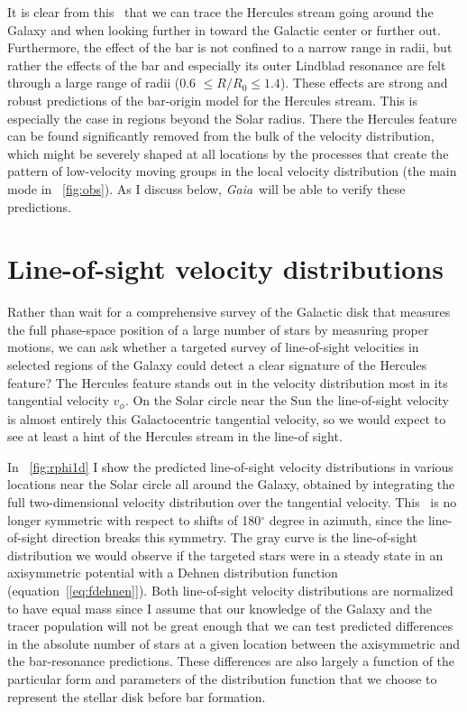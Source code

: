 \documentclass[12pt,preprint]{aastex}
\newcommand{\eqnname}{equation}
\newcommand{\Gaia}{\emph{Gaia}}
\newcommand{\vphi}{\ensuremath{v_{\phi}}}
\newcommand{\Ro}{\ensuremath{R_0}}
\begin{document}
It is clear from this \figurename\ that we can trace the Hercules
stream going around the Galaxy and when looking further in toward the
Galactic center or further out. Furthermore, the effect of the bar is
not confined to a narrow range in radii, but rather the effects of the
bar and especially its outer Lindblad resonance are felt through a
large range of radii (0.6 $\leq R/\Ro \leq 1.4$). These effects are
strong and robust predictions of the bar-origin model for the Hercules
stream. This is especially the case in regions beyond the Solar
radius. There the Hercules feature can be found significantly removed
from the bulk of the velocity distribution, which might be severely
shaped at all locations by the processes that create the pattern of
low-velocity moving groups in the local velocity distribution (the
main mode in \figurename~\ref{fig:obs}). As I discuss below, \Gaia\
will be able to verify these predictions.




\section{Line-of-sight velocity distributions}

Rather than wait for a comprehensive survey of the Galactic disk that
measures the full phase-space position of a large number of stars by
measuring proper motions, we can ask whether a targeted survey of
line-of-sight velocities in selected regions of the Galaxy could
detect a clear signature of the Hercules feature? The Hercules feature
stands out in the velocity distribution most in its tangential
velocity $\vphi$. On the Solar circle near the Sun the line-of-sight
velocity is almost entirely this Galactocentric tangential velocity,
so we would expect to see at least a hint of the Hercules stream in
the line-of sight.

In \figurename~\ref{fig:rphi1d} I show the predicted line-of-sight
velocity distributions in various locations near the Solar circle all
around the Galaxy, obtained by integrating the full two-dimensional
velocity distribution over the tangential velocity. This \figurename\
is no longer symmetric with respect to shifts of 180$^{\circ}$ degree
in azimuth, since the line-of-sight direction breaks this
symmetry. The gray curve is the line-of-sight distribution we would
observe if the targeted stars were in a steady state in an
axisymmetric potential with a Dehnen distribution function
(\eqnname~[\ref{eq:fdehnen}]). Both line-of-sight velocity
distributions are normalized to have equal mass since I assume that
our knowledge of the Galaxy and the tracer population will not be
great enough that we can test predicted differences in the absolute
number of stars at a given location between the axisymmetric and the
bar-resonance predictions. These differences are also largely a
function of the particular form and parameters of the distribution
function that we choose to represent the stellar disk before bar
formation.
\end{document}

